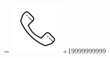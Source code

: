 \documentclass[]{plushcv}
\begin{document}
\begin{minipage}[t]{0.25\textwidth}
{        }
        \parbox{\wd0}{}
        \endgroup
        \begingroup
        =\hbox{
            \includegraphics[scale=0.1,trim={0 1.25cm -0.4cm 0cm}]{icons/main/phone.png}\hspace{0.3cm}+19999999999
        }
        \parbox{\wd0}{}\endgroup
        \\






    \end{minipage}
\end{document}
